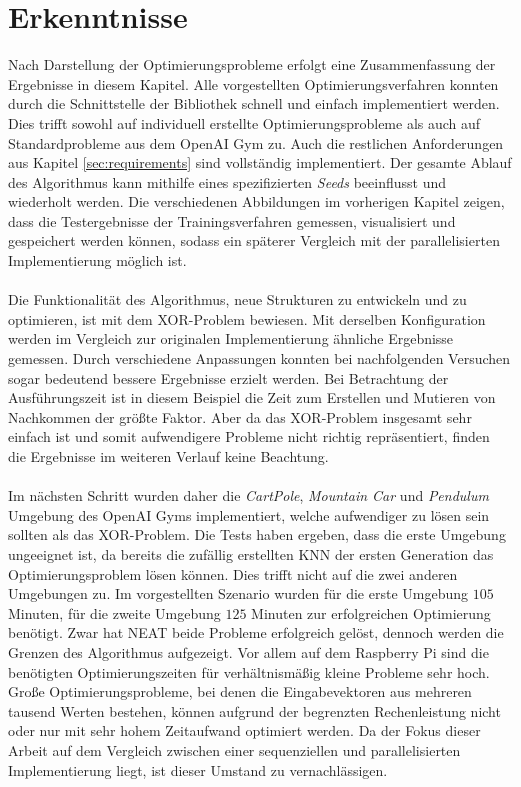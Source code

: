 \section{Erkenntnisse}
\label{sec:analysis_results}
Nach Darstellung der Optimierungsprobleme erfolgt eine Zusammenfassung der Ergebnisse in diesem Kapitel. Alle vorgestellten Optimierungsverfahren konnten durch die Schnittstelle der Bibliothek schnell und einfach implementiert werden. Dies trifft sowohl auf individuell erstellte Optimierungsprobleme als auch auf Standardprobleme aus dem OpenAI Gym zu. Auch die restlichen Anforderungen aus Kapitel \ref{sec:requirements} sind vollständig implementiert. Der gesamte Ablauf des Algorithmus kann mithilfe eines spezifizierten \emph{Seeds} beeinflusst und wiederholt werden. Die verschiedenen Abbildungen im vorherigen Kapitel zeigen, dass die Testergebnisse der Trainingsverfahren gemessen, visualisiert und gespeichert werden können, sodass ein späterer Vergleich mit der parallelisierten Implementierung möglich ist.
\\\\
Die Funktionalität des Algorithmus, neue Strukturen zu entwickeln und zu optimieren, ist mit dem XOR-Problem bewiesen. Mit derselben Konfiguration werden im Vergleich zur originalen Implementierung ähnliche Ergebnisse gemessen. Durch verschiedene Anpassungen konnten bei nachfolgenden Versuchen sogar bedeutend bessere Ergebnisse erzielt werden. Bei Betrachtung der Ausführungszeit ist in diesem Beispiel die Zeit zum Erstellen und Mutieren von Nachkommen der größte Faktor. Aber da das XOR-Problem insgesamt sehr einfach ist und somit aufwendigere Probleme nicht richtig repräsentiert, finden die Ergebnisse im weiteren Verlauf keine Beachtung.
\\\\
Im nächsten Schritt wurden daher die \emph{CartPole}, \emph{Mountain Car} und \emph{Pendulum} Umgebung des OpenAI Gyms implementiert, welche aufwendiger zu lösen sein sollten als das XOR-Problem. Die Tests haben ergeben, dass die erste Umgebung ungeeignet ist, da bereits die zufällig erstellten \ac{KNN} der ersten Generation das Optimierungsproblem lösen können. Dies trifft nicht auf die zwei anderen Umgebungen zu. Im vorgestellten Szenario wurden für die erste Umgebung $105$ Minuten, für die zweite Umgebung $125$ Minuten zur erfolgreichen Optimierung benötigt. Zwar hat \ac{NEAT} beide Probleme erfolgreich gelöst, dennoch werden die Grenzen des Algorithmus aufgezeigt. Vor allem auf dem Raspberry Pi sind die benötigten Optimierungszeiten für verhältnismäßig kleine Probleme sehr hoch. Große Optimierungsprobleme, bei denen die Eingabevektoren aus mehreren tausend Werten bestehen, können aufgrund der begrenzten Rechenleistung nicht oder nur mit sehr hohem Zeitaufwand optimiert werden. Da der Fokus dieser Arbeit auf dem Vergleich zwischen einer sequenziellen und parallelisierten Implementierung liegt, ist dieser Umstand zu vernachlässigen.
